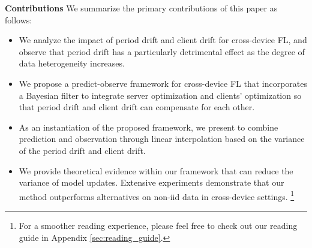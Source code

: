 \textbf{Contributions} We summarize the primary contributions of this paper as follows:
\begin{itemize}[leftmargin=*,nosep]
   \item We analyze the impact of period drift and client drift for cross-device FL, and observe that period drift has a particularly detrimental effect as the degree of data heterogeneity increases.
   \item We propose a predict-observe framework for cross-device FL that incorporates a Bayesian filter to integrate server optimization and clients' optimization so that period drift and client drift can compensate for each other.
   \item As an instantiation of the proposed framework, we present \fedeve to combine prediction and observation through linear interpolation based on the variance of the period drift and client drift.
   \item We provide theoretical evidence within our framework that \fedeve can reduce the variance of model updates. Extensive experiments demonstrate that our method outperforms alternatives on non-iid data in cross-device settings. 
\footnote{For a smoother reading experience, please feel free to check out our reading guide in Appendix \ref{sec:reading_guide}.}
\end{itemize}




